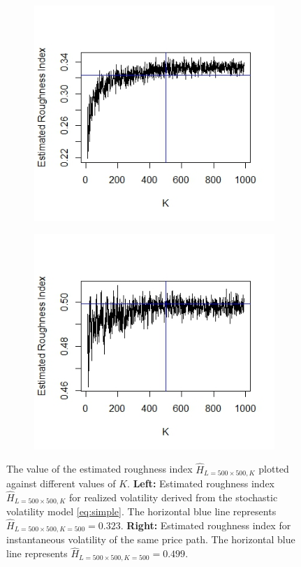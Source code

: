 \documentclass{article}
\begin{document}
\begin{figure}[htbp]
    \begin{subfigure}{0.48\textwidth}
        \includegraphics[width=\linewidth]{ex5_RVk.jpeg}
    \end{subfigure}
    \hfill
    \begin{subfigure}{0.48\textwidth}
        \includegraphics[width=\linewidth]{ex5_IVk.jpeg}
    \end{subfigure}
    
    \caption{The value of the estimated roughness index $\hat{H}_{L = 500\times 500 ,K}$ plotted against different values of $K$. \textbf{Left:} Estimated roughness index $\hat{H}_{L= 500\times 500,K}$ for realized volatility derived from the stochastic volatility model \eqref{eq:simple}. The horizontal blue line represents $\hat{H}_{L=500\times 500,K = 500} = 0.323$. \textbf{Right:} Estimated roughness index for instantaneous volatility of the same price path. The horizontal blue line represents $\hat{H}_{L=500\times 500,K = 500} = 0.499$.}
    \label{fig:ex5k}
\end{figure}\\\\
\end{document}
